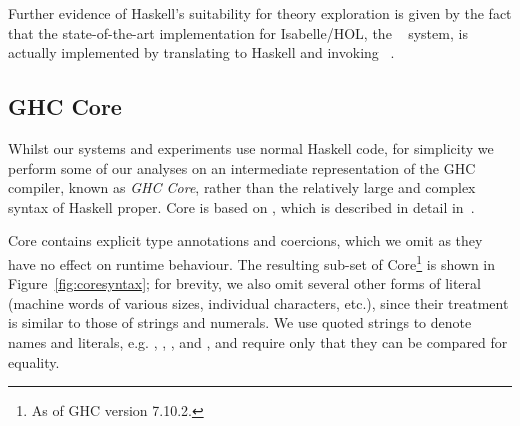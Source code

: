 Further evidence of Haskell's suitability for theory exploration is given by the
fact that the state-of-the-art implementation for Isabelle/HOL, the
\hipster{}~\cite{Hipster} system, is actually implemented by translating
to Haskell and invoking \hipspec{}~\cite{claessen2013automating}.

\subsection{GHC Core}
\label{sec:ghccore}

Whilst our systems and experiments use normal Haskell code, for simplicity we
perform some of our analyses on an intermediate representation of the
\textsc{GHC} compiler, known as \emph{GHC Core}, rather than the relatively
large and complex syntax of Haskell proper. Core is based on \fc{}, which is
described in detail in~\cite[Appendix C]{sulzmann2007system}.

Core contains explicit type annotations and coercions, which we omit as they
have no effect on runtime behaviour. The resulting sub-set of Core\footnote{As
  of GHC version 7.10.2.} is shown in Figure~\ref{fig:coresyntax}; for brevity,
we also omit several other forms of literal (machine words of various sizes,
individual characters, etc.), since their treatment is similar to those of
strings and numerals. We use quoted strings to denote names and literals,
e.g. , , ,  and , and require only that they can be compared for
equality.

